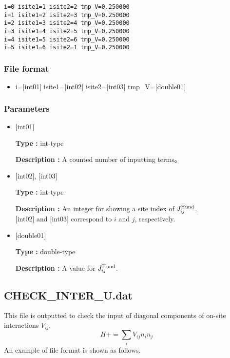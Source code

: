 \begin{minipage}{12.5cm}
\begin{screen}
\begin{verbatim}
i=0 isite1=1 isite2=2 tmp_V=0.250000 
i=1 isite1=2 isite2=3 tmp_V=0.250000 
i=2 isite1=3 isite2=4 tmp_V=0.250000 
i=3 isite1=4 isite2=5 tmp_V=0.250000 
i=4 isite1=5 isite2=6 tmp_V=0.250000 
i=5 isite1=6 isite2=1 tmp_V=0.250000 
\end{verbatim}
\end{screen}
\end{minipage}

\subsubsection{File format}
 \begin{itemize}
   \item  i=$[$int01$]$ isite1=$[$int02$]$ isite2=$[$int03$]$ tmp\_V=$[$double01$]$ 
 \end{itemize}
 
\subsubsection{Parameters}
 \begin{itemize}

    \item  $[$int01$]$ 
   
    {\bf Type :} int-type

   {\bf Description :} A counted number of inputting terms。
      
   \item  $[$int02$]$, $[$int03$]$
   
    {\bf Type :} int-type

    {\bf Description :}  An integer for showing a site index of $J_{ij}^{\rm Hund}$. \\
    $[$int02$]$ and $[$int03$]$ correspond to $i$ and $j$, respectively.
 
   \item  $[$double01$]$ 
   
    {\bf Type :} double-type

   {\bf Description :} A value for $J_{ij}^{\rm Hund}$.
\end{itemize}

\newpage
\subsection{CHECK\_INTER\_U.dat}
This file is outputted to check the input of diagonal components of on-site interactions $V_{ij}$,
\begin{equation}
H+=\sum_{i} V_{ij} n_{i} n_{j}
\end{equation}
An example of file format is shown as follows.

